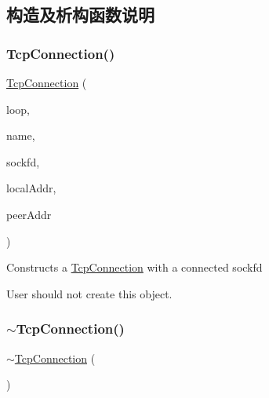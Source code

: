 \subsection{构造及析构函数说明}
\mbox{\label{classmuduo_1_1net_1_1TcpConnection_a2603ff299e8c8769208e266171558556}} 
\subsubsection{\texorpdfstring{Tcp\+Connection()}{TcpConnection()}}
{\footnotesize\ttfamily \hyperlink{classmuduo_1_1net_1_1TcpConnection}{Tcp\+Connection} (\begin{DoxyParamCaption}\item[{\hyperlink{classmuduo_1_1net_1_1EventLoop}{Event\+Loop} $\ast$}]{loop,  }\item[{const string \&}]{name,  }\item[{int}]{sockfd,  }\item[{const \hyperlink{classmuduo_1_1net_1_1InetAddress}{Inet\+Address} \&}]{local\+Addr,  }\item[{const \hyperlink{classmuduo_1_1net_1_1InetAddress}{Inet\+Address} \&}]{peer\+Addr }\end{DoxyParamCaption})}

Constructs a \hyperlink{classmuduo_1_1net_1_1TcpConnection}{Tcp\+Connection} with a connected sockfd

User should not create this object. \mbox{\label{classmuduo_1_1net_1_1TcpConnection_a0a3551d2f9a37ccec8f9cb913e73878a}} 
\subsubsection{\texorpdfstring{$\sim$\+Tcp\+Connection()}{~TcpConnection()}}
{\footnotesize\ttfamily $\sim$\hyperlink{classmuduo_1_1net_1_1TcpConnection}{Tcp\+Connection} (\begin{DoxyParamCaption}{ }\end{DoxyParamCaption})}



